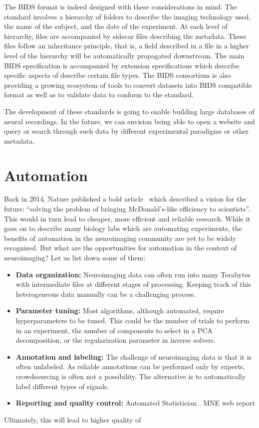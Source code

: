The BIDS format is indeed designed with these considerations in mind. The standard involves a hierarchy of folders to describe the imaging technology used, the name of the subject, and the date of the experiment. At each level of hierarchy, files are accompanied by sidecar  files describing the metadata. These files follow an inheritance principle, that is, a field described in a  file in a higher level of the hierarchy will be automatically propagated downstream. The main BIDS specification is accompanied by extension specifications which describe specific aspects of describe certain file types. The BIDS consortium is also providing a growing ecosystem of tools to convert datasets into BIDS compatible format as well as to validate data to conform to the standard. 

The development of these standards is going to enable building large databases of neural recordings. In the future, we can envision being able to open a website and query or search through such data by different experimental paradigms or other metadata.

\section{Automation}
Back in 2014, Nature published a bold article~\citep{hayden2014automated} which described a vision for the future: ``solving the problem of bringing McDonald's-like efficiency to scientists''. This would in turn lead to cheaper, more efficient and reliable research. While it goes on to describe many biology labs which are automating experiments, the benefits of automation in the neuroimaging community are yet to be widely recognized. But what are the opportunities for automation in the context of neuroimaging? Let us list down some of them:
\begin{itemize}[noitemsep,nolistsep,nosep]
\item \textbf{Data organization:} Neuroimaging data can often run into many Terabytes with intermediate files at different stages of processing. Keeping track of this heterogeneous data manually can be a challenging process.
\item \textbf{Parameter tuning:} Most algorithms, although automated, require hyperparameters to be tuned. This could be the number of trials to perform in an experiment, the number of components to select in a \ac{PCA} decomposition, or the regularization parameter in inverse solvers.
\item \textbf{Annotation and labeling:} The challenge of neuroimaging data is that it is often unlabeled. As reliable annotations can be performed only by experts, crowdsourcing is often not a possibility. The alternative is to automatically label different types of signals.
\item \textbf{Reporting and quality control:} Automated Statistician . \ac{MNE} web report
\end{itemize}
Ultimately, this will lead to higher quality of 

